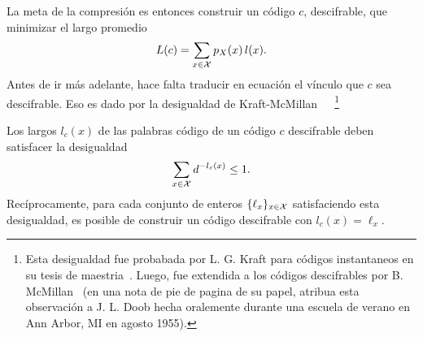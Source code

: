 La meta de  la compresi\'on es entonces construir  un c\'odigo $c$, descifrable,
que minimizar el largo promedio
%
\[
L(c) = \sum_{x \in \mathcal{X}} p_X(x) \, l(x).
\]
%
Antes de ir  m\'as adelante, hace falta traducir en  ecuaci\'on el v\'inculo que
$c$    sea    descifrable.    Eso    es    dado    por    la   desigualdad    de
Kraft-McMillan~~\cite{Kra49,   McM56,   Kar61}~\footnote{Esta  desigualdad   fue
  probabada  por  L.  G.   Kraft  para c\'odigos  instantaneos  en  su tesis  de
  maestria~\cite{Kra49}.  Luego, fue extendida  a los c\'odigos descifrables por
  B.  McMillan~\cite{McM56} (en  una nota de pie de pagina  de su papel, atribua
  esta  observaci\'on a J.   L.  Doob  hecha oralemente  durante una  escuela de
  verano en Ann Arbor, MI en agosto 1955).}
%
\begin{teorema}
\label{Teo:SZ:KraftMcMillan}
%
  Los largos  $l_c(x)$ de las palabras  c\'odigo de un  c\'odigo $c$ descifrable
  deben satisfacer la desigualdad
  \[
  \sum_{x \in \mathcal{X}} d^{-l_c(x)} \le 1.
  \]
  Rec\'iprocamente,  para cada  conjunto de  enteros $\{  \ell_x \}_{x  \in \mathcal{X}}$
  satisfaciendo  esta   desigualdad,  es   posible  de  construir   un  c\'odigo
  descifrable con $l_c(x) = \ell_x$.
\end{teorema}
%
